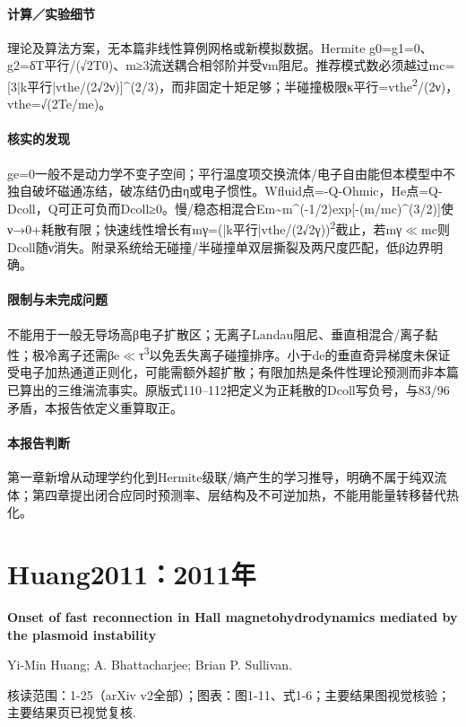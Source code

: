 \paragraph{计算／实验细节}理论及算法方案，无本篇非线性算例网格或新模拟数据。Hermite g0=g1=0、g2=δT平行/(√2T0)、m≥3流送耦合相邻阶并受νm阻尼。推荐模式数必须越过mc=[3|k平行|vthe/(2√2ν)]\textasciicircum{}(2/3)，而非固定十矩足够；半碰撞极限κ平行=vthe\textsuperscript{2}/(2ν)，vthe=√(2Te/me)。

\paragraph{核实的发现}ge=0一般不是动力学不变子空间；平行温度项交换流体/电子自由能但本模型中不独自破坏磁通冻结，破冻结仍由η或电子惯性。Wfluid点=-Q-Ohmic，He点=Q-Dcoll，Q可正可负而Dcoll≥0。慢/稳态相混合Em\textasciitilde{}m\textasciicircum{}(-1/2)exp[-(m/mc)\textasciicircum{}(3/2)]使ν→0+耗散有限；快速线性增长有mγ=(|k平行|vthe/(2√2γ))\textsuperscript{2}截止，若mγ\ensuremath{\ll}mc则Dcoll随ν消失。附录系统给无碰撞/半碰撞单双层撕裂及两尺度匹配，低β边界明确。

\paragraph{限制与未完成问题}不能用于一般无导场高β电子扩散区；无离子Landau阻尼、垂直相混合/离子黏性；极冷离子还需βe\ensuremath{\ll}τ\textsuperscript{3}以免丢失离子碰撞排序。小于de的垂直奇异梯度未保证受电子加热通道正则化，可能需额外超扩散；有限加热是条件性理论预测而非本篇已算出的三维湍流事实。原版式110–112把定义为正耗散的Dcoll写负号，与83/96矛盾，本报告依定义重算取正。

\paragraph{本报告判断}第一章新增从动理学约化到Hermite级联/熵产生的学习推导，明确不属于纯双流体；第四章提出闭合应同时预测率、层结构及不可逆加热，不能用能量转移替代热化。

\section{Huang2011：2011年}\label{paper:Huang2011}

\textbf{Onset of fast reconnection in Hall magnetohydrodynamics mediated by the plasmoid instability}\citep{Huang2011}\

Yi-Min Huang;  A. Bhattacharjee;  Brian P. Sullivan.

\textsf{核读范围：}1-25（arXiv v2全部）；\textsf{图表：}图1-11、式1-6；主要结果图视觉核验；主要结果页已视觉复核.

